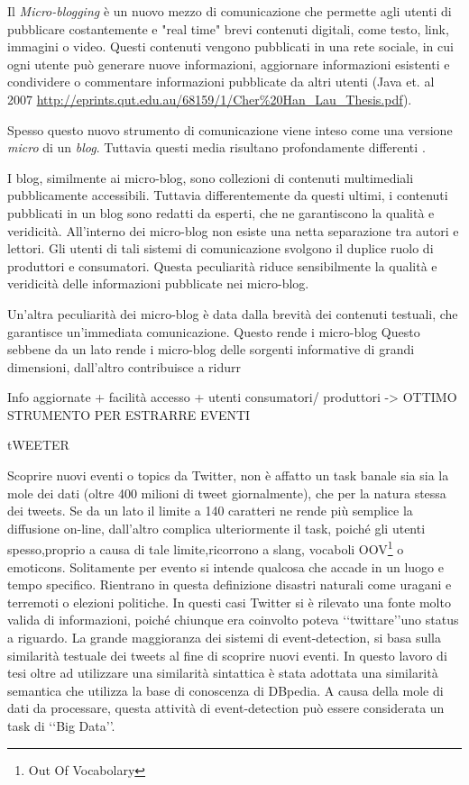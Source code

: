 
Il \emph{Micro-blogging} è un nuovo mezzo di comunicazione che permette agli utenti di pubblicare costantemente e "real time" brevi contenuti digitali, come testo, link, immagini o video. Questi contenuti vengono pubblicati in una rete sociale, in cui ogni utente può generare nuove informazioni, aggiornare informazioni esistenti e condividere o commentare informazioni pubblicate da altri utenti \cite{} (Java et. al 2007 \url{http://eprints.qut.edu.au/68159/1/Cher%20Han_Lau_Thesis.pdf}).  

Spesso questo nuovo strumento di comunicazione viene inteso come una versione \emph{micro} di un \emph{blog}. Tuttavia questi media risultano profondamente differenti \cite{export:69500}. 

I blog, similmente ai micro-blog, sono collezioni di contenuti multimediali pubblicamente accessibili. 
Tuttavia differentemente da questi ultimi, i contenuti pubblicati in un blog sono redatti da esperti, che ne garantiscono la qualità e veridicità. All'interno dei micro-blog non esiste una netta separazione tra autori e lettori. Gli utenti di tali sistemi di comunicazione svolgono il duplice ruolo di produttori e consumatori. Questa peculiarità riduce sensibilmente la qualità e veridicità delle informazioni pubblicate nei micro-blog. 

Un'altra peculiarità 
dei micro-blog è data dalla brevità dei contenuti testuali, che garantisce un'immediata comunicazione. Questo rende i micro-blog 
Questo sebbene da un lato rende i micro-blog delle sorgenti informative di grandi dimensioni, dall'altro contribuisce a ridurr 
   
   
   Info aggiornate + facilità accesso + utenti consumatori/ produttori -> OTTIMO STRUMENTO PER ESTRARRE EVENTI
   
   tWEETER
   

   
\color{red} 
Scoprire nuovi eventi o topics da Twitter, non è affatto un task banale sia 
sia la mole dei dati (oltre 400 milioni di tweet giornalmente), che per la natura stessa dei tweets. Se da un lato il limite a 140 caratteri ne rende più semplice la diffusione on-line, dall'altro complica ulteriormente il task, poiché gli utenti spesso,proprio a causa di tale limite,ricorrono a slang, vocaboli OOV\footnote{Out Of Vocabolary} o emoticons. Solitamente per evento si intende qualcosa che accade in un luogo e tempo specifico. Rientrano in questa definizione disastri naturali come uragani e terremoti o elezioni politiche. In questi casi Twitter si è rilevato una  fonte molto valida di informazioni, poiché chiunque era coinvolto poteva \lq\lq twittare\rq\rq uno status a riguardo.
La grande maggioranza dei sistemi di event-detection, si basa sulla similarità testuale dei tweets al fine di scoprire nuovi eventi. In questo lavoro di tesi oltre ad utilizzare una similarità sintattica è stata adottata una similarità semantica che utilizza la  base di conoscenza di DBpedia.
A causa della mole di dati da  processare, questa attività di event-detection può essere considerata un task di \lq\lq Big Data\rq\rq.
